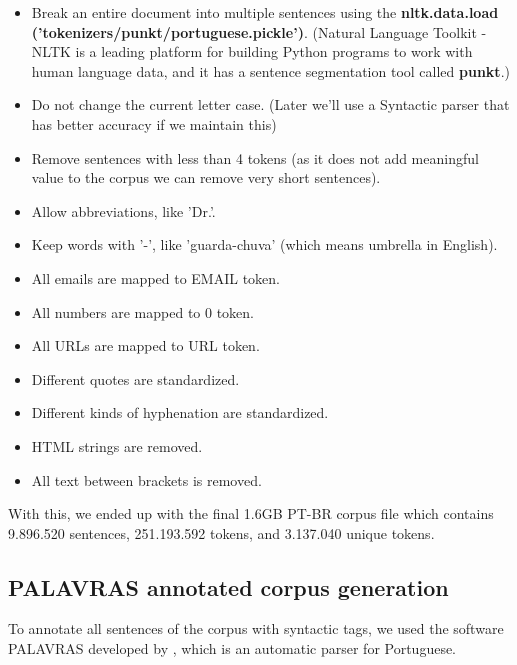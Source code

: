 \begin{itemize}
    \item Break an entire document into multiple sentences using the 
    \textbf{nltk.data.load ('tokenizers/punkt/portuguese.pickle')}. (Natural Language Toolkit - NLTK is a leading platform for building Python programs to work with human language data, and it has a sentence segmentation tool called \textbf{punkt}.)
    \item Do not change the current letter case. (Later we'll use a Syntactic parser that has better accuracy if we maintain this)
    \item Remove sentences with less than 4 tokens (as it does not add meaningful value to the corpus we can remove very short sentences).
    \item Allow abbreviations, like 'Dr.'.
    \item Keep words with '-', like 'guarda-chuva' (which means umbrella in English).
    \item All emails are mapped to EMAIL token.
    \item All numbers are mapped to 0 token.
    \item All URLs are mapped to URL token.
    \item Different quotes are standardized.
    \item Different kinds of hyphenation are standardized.
    \item HTML strings are removed.
    \item All text between brackets is removed.
\end{itemize}

With this, we ended up with the final 1.6GB PT-BR corpus file which contains 9.896.520 sentences, 251.193.592 tokens, and 3.137.040 unique tokens.


\subsection{PALAVRAS annotated corpus generation}\label{chap:methodsandmaterials:palavras}

To annotate all sentences of the corpus with syntactic tags, we used the software PALAVRAS developed by , which is an automatic parser for Portuguese.

